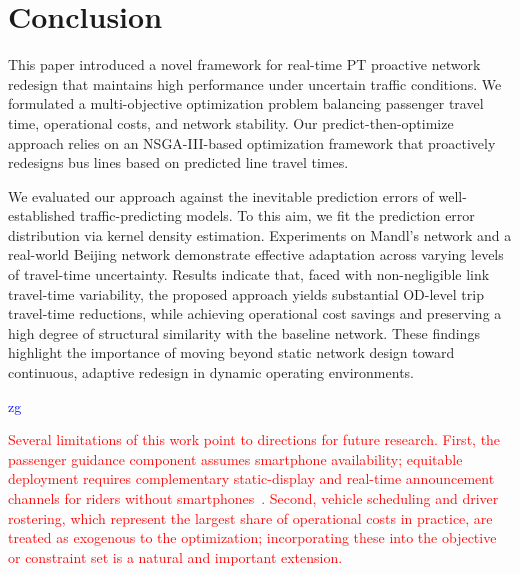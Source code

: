 \documentclass[a4paper,fleqn]{cas-sc}
\newcommand{\stkout}[1]{\ifmmode\text{\sout{\ensuremath{#1}}}\else\sout{#1}\fi}
\newcommand\rev[3]{\textcolor{blue}{\begin{scriptsize}{#1}\end{scriptsize}\stkout{#2}}\textcolor{red}{#3}}
\newcommand\rev[3]{\ignorespaces#3\ignorespaces\unskip}
\begin{document}
\section{Conclusion}\label{sec:conclu}
This paper introduced a novel framework for real-time PT proactive network redesign that maintains high performance under uncertain traffic conditions. We formulated a multi-objective optimization problem balancing passenger travel time, operational costs, and network stability. Our predict-then-optimize approach relies on an NSGA-III-based optimization framework that proactively redesigns bus lines based on predicted line travel times. 

We evaluated our approach against the inevitable prediction errors of well-established traffic-predicting models. To this aim, we fit the prediction error distribution via kernel density estimation.
Experiments on Mandl's network and a real-world Beijing network demonstrate effective adaptation across varying levels of travel-time uncertainty. 
%
Results indicate that, faced with non-negligible link travel-time variability, the proposed approach yields substantial OD-level trip travel-time reductions, while achieving operational cost savings and preserving a high degree of structural similarity with the baseline network.
%
These findings highlight the importance of moving beyond static network design toward continuous, adaptive redesign in dynamic operating environments.

\rev{zg}{}{Several limitations of this work point to directions for future research. First, the passenger guidance component assumes smartphone availability; equitable deployment requires complementary static-display and real-time announcement channels for riders without smartphones~\citep{SmartphoneUse2016}. Second, vehicle scheduling and driver rostering, which represent the largest share of operational costs in practice, are treated as exogenous to the optimization; incorporating these into the objective or constraint set is a natural and important extension.}

\end{document}
